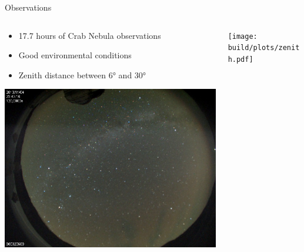 \documentclass[compress, 9pt, aspectratio=1610, professionalfonts]{beamer}
\begin{document}
\begin{frame}[c]{Observations}
  \begin{columns}[onlytextwidth]
    \begin{column}{0.475\textwidth}      
      \begin{itemize}
        \item \num{17.7} hours of Crab Nebula observations
        \item Good environmental conditions
        \item Zenith distance between \ang{6} and \ang{30}
      \end{itemize}
      \vspace{0.25cm}
      \begin{center}
        \includegraphics[width=0.75\linewidth]{images/gtc.jpg}
      \end{center}
    \end{column}
    \hfill
    \begin{column}{0.475\textwidth}      
      \texttt{[image: build/plots/zenith.pdf]}
    \end{column}
  \end{columns}
  
\end{frame}
\end{document}
